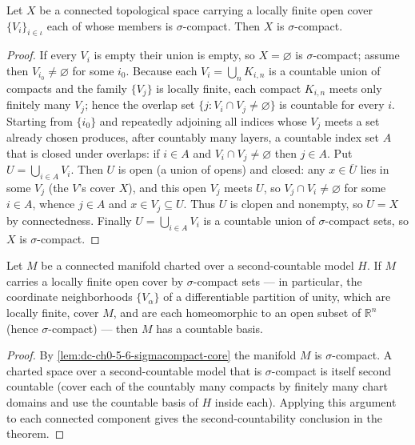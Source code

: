 \begin{lemma}
  \label{lem:dc-ch0-5-6-sigmacompact-core}
  \leanok
  Let $X$ be a connected topological space carrying a locally finite open cover
  $\{V_i\}_{i\in\iota}$ each of whose members is $\sigma$-compact. Then $X$ is
  $\sigma$-compact.
\end{lemma}
\begin{proof}
  \sketch
  \leanok
  If every $V_i$ is empty their union is empty, so $X=\varnothing$ is
  $\sigma$-compact; assume then $V_{i_0}\neq\varnothing$ for some $i_0$. Because each
  $V_i=\bigcup_n K_{i,n}$ is a countable union of compacts and the family
  $\{V_j\}$ is locally finite, each compact $K_{i,n}$ meets only finitely many
  $V_j$; hence the overlap set $\{j : V_i\cap V_j\neq\varnothing\}$ is countable for
  every $i$.
  Starting from $\{i_0\}$ and repeatedly adjoining all indices whose $V_j$ meets a
  set already chosen produces, after countably many layers, a countable index set
  $A$ that is closed under overlaps: if $i\in A$ and $V_i\cap V_j\neq\varnothing$
  then $j\in A$. Put $U=\bigcup_{i\in A}V_i$. Then $U$ is open (a union of opens) and
  closed: any $x\in\overline U$ lies in some $V_j$ (the $V$'s cover $X$), and this
  open $V_j$ meets $U$, so $V_j\cap V_i\neq\varnothing$ for some $i\in A$, whence
  $j\in A$ and $x\in V_j\subseteq U$. Thus $U$ is clopen and nonempty, so $U=X$ by
  connectedness. Finally $U=\bigcup_{i\in A}V_i$ is a countable union of
  $\sigma$-compact sets, so $X$ is $\sigma$-compact.
\end{proof}

\begin{lemma}
  \label{lem:dc-ch0-5-6-onlyif}
  \leanok
  Let $M$ be a connected manifold charted over a second-countable model $H$. If $M$
  carries a locally finite open cover by $\sigma$-compact sets — in particular, the
  coordinate neighborhoods $\{V_\alpha\}$ of a differentiable partition of unity,
  which are locally finite, cover $M$, and are each homeomorphic to an open subset
  of $\mathbb{R}^n$ (hence $\sigma$-compact) — then $M$ has a countable basis.
\end{lemma}
\begin{proof}
  \sketch
  \leanok
  By \cref{lem:dc-ch0-5-6-sigmacompact-core} the manifold $M$ is $\sigma$-compact.
  A charted space over a second-countable model that is $\sigma$-compact is itself
  second countable (cover each of the countably many compacts by finitely many chart
  domains and use the countable basis of $H$ inside each). Applying this argument to
  each connected component gives the second-countability
  conclusion in the theorem.
\end{proof}

